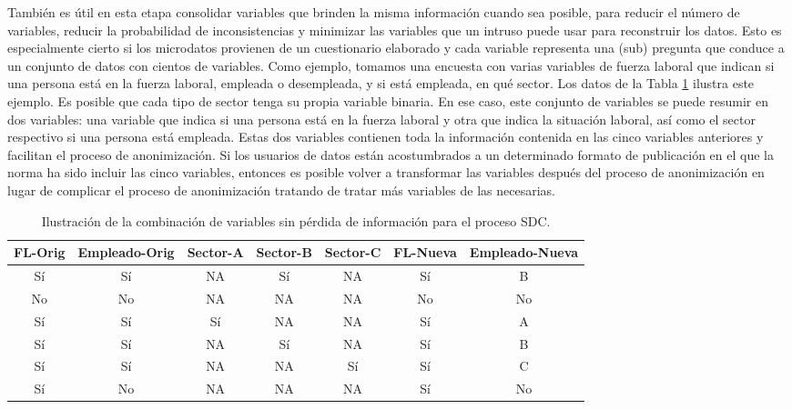 \documentclass[
]{book}
\theoremstyle{definition}
\theoremstyle{definition}
\theoremstyle{definition}
\theoremstyle{definition}
\theoremstyle{remark}
\begin{document}
También es útil en esta etapa consolidar variables que brinden la misma información cuando sea posible, para reducir el número de variables, reducir la probabilidad de inconsistencias y minimizar las variables que un intruso puede usar para reconstruir los datos. Esto es especialmente cierto si los microdatos provienen de un cuestionario elaborado y cada variable representa una (sub) pregunta que conduce a un conjunto de datos con cientos de variables. Como ejemplo, tomamos una encuesta con varias variables de fuerza laboral que indican si una persona está en la fuerza laboral, empleada o desempleada, y si está empleada, en qué sector. Los datos de la Tabla \ref{tab:tabProc1} ilustra este ejemplo. Es posible que cada tipo de sector tenga su propia variable binaria. En ese caso, este conjunto de variables se puede resumir en dos variables: una variable que indica si una persona está en la fuerza laboral y otra que indica la situación laboral, así como el sector respectivo si una persona está empleada. Estas dos variables contienen toda la información contenida en las cinco variables anteriores y facilitan el proceso de anonimización. Si los usuarios de datos están acostumbrados a un determinado formato de publicación en el que la norma ha sido incluir las cinco variables, entonces es posible volver a transformar las variables después del proceso de anonimización en lugar de complicar el proceso de anonimización tratando de tratar más variables de las necesarias.

\begin{table}

\caption{\label{tab:tabProc1}Ilustración de la combinación de variables sin pérdida de información para el proceso SDC.}
\centering
\begin{tabular}[t]{c|c|c|c|c|c|c}
\hline
FL-Orig & Empleado-Orig & Sector-A & Sector-B & Sector-C & FL-Nueva & Empleado-Nueva\\
\hline
Sí & Sí & NA & Sí & NA & Sí & B\\
\hline
No & No & NA & NA & NA & No & No\\
\hline
Sí & Sí & Sí & NA & NA & Sí & A\\
\hline
Sí & Sí & NA & Sí & NA & Sí & B\\
\hline
Sí & Sí & NA & NA & Sí & Sí & C\\
\hline
Sí & No & NA & NA & NA & Sí & No\\
\hline
\end{tabular}
\end{table}
\end{document}
